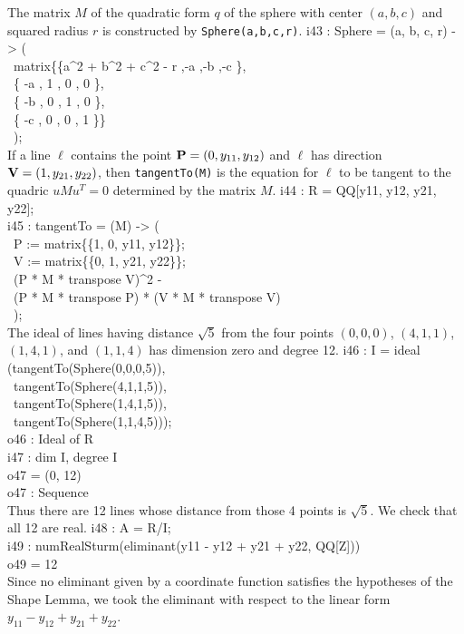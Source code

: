 The matrix $M$ of the quadratic form $q$ of the sphere with
center $(a,b,c)$ and squared radius $r$ is constructed by 
{\tt Sphere(a,b,c,r)}.
%
\beginOutput
i43 : Sphere = (a, b, c, r) -> (\\
\              matrix\{\{a^2 + b^2 + c^2 - r ,-a ,-b ,-c \},\\
\                     \{         -a         , 1 , 0 , 0 \},\\
\                     \{         -b         , 0 , 1 , 0 \},\\
\                     \{         -c         , 0 , 0 , 1 \}\}\\
\              );\\
\endOutput
%
If a line $\ell$ contains the point ${\bf P}=(0,y_{11},y_{12})$ 
and $\ell$ has direction ${\bf V} = (1,y_{21},y_{22})$, then 
{\tt tangentTo(M)} is the equation for $\ell$ to be tangent to the 
quadric $uMu^T=0$ determined by the matrix $M$.
%
\beginOutput
i44 : R = QQ[y11, y12, y21, y22];\\
\endOutput
%
\beginOutput
i45 : tangentTo = (M) -> (\\
\           P := matrix\{\{1, 0, y11, y12\}\};\\
\           V := matrix\{\{0, 1, y21, y22\}\};\\
\           (P * M * transpose V)^2 - \\
\             (P * M * transpose P) * (V * M * transpose V)\\
\           );\\
\endOutput
The ideal of lines having distance $\sqrt{5}$ from the four points
$(0,0,0)$, $(4,1,1)$, $(1,4,1)$, and $(1,1,4)$ has dimension zero and degree 12.
%
\beginOutput
i46 : I = ideal (tangentTo(Sphere(0,0,0,5)), \\
\                 tangentTo(Sphere(4,1,1,5)), \\
\                 tangentTo(Sphere(1,4,1,5)), \\
\                 tangentTo(Sphere(1,1,4,5)));\\
\emptyLine
o46 : Ideal of R\\
\endOutput
%
\beginOutput
i47 : dim I, degree I\\
\emptyLine
o47 = (0, 12)\\
\emptyLine
o47 : Sequence\\
\endOutput
%
Thus there are 12 lines whose distance from those 4 points is $\sqrt{5}$.
We check that all 12 are real.
%
\beginOutput
i48 : A = R/I;\\
\endOutput
%
\beginOutput
i49 : numRealSturm(eliminant(y11 - y12 + y21 + y22, QQ[Z]))\\
\emptyLine
o49 = 12\\
\endOutput
%
Since no eliminant given by a coordinate function satisfies
the hypotheses of the Shape Lemma, 
we took the eliminant with respect to the linear form
$y_{11} - y_{12} + y_{21} + y_{22}$.

